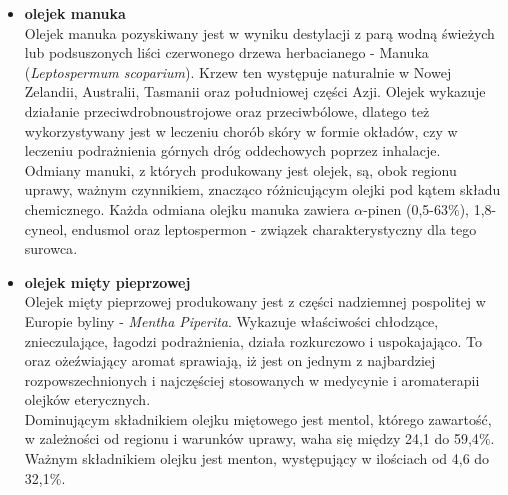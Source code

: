 \documentclass[11pt,a4paper]{report}
\begin{document}
\begin{itemize}
\clearpage
\item \textbf{olejek manuka}\\
Olejek manuka pozyskiwany jest w wyniku destylacji z parą wodną świeżych lub podsuszonych liści czerwonego drzewa herbacianego - Manuka (\textit{Leptospermum scoparium}). Krzew ten występuje naturalnie w Nowej Zelandii, Australii, Tasmanii oraz południowej części Azji. Olejek wykazuje działanie przeciwdrobnoustrojowe oraz przeciwbólowe, dlatego też wykorzystywany jest w leczeniu chorób skóry w formie okładów, czy w leczeniu podrażnienia górnych dróg oddechowych poprzez inhalacje\cite{lis, pollena_ma}.\\
Odmiany manuki, z których produkowany jest olejek, są, obok regionu uprawy,  ważnym czynnikiem, znacząco różnicującym olejki pod kątem składu chemicznego. 
Każda odmiana olejku manuka zawiera $\alpha$-pinen (0,5-63$\%$), 1,8-cyneol, endusmol oraz leptospermon - związek charakterystyczny dla tego surowca\cite{manukaikanuka, lis}.


\item \textbf{olejek mięty pieprzowej}\\
Olejek mięty pieprzowej produkowany jest z części nadziemnej pospolitej w Europie byliny - \textit{Mentha Piperita}\cite{pollena_mi}. Wykazuje właściwości chłodzące, znieczulające, łagodzi podrażnienia, działa rozkurczowo i uspokajająco. To oraz ożeźwiający aromat sprawiają, iż jest on jednym z najbardziej rozpowszechnionych i najczęściej stosowanych w medycynie i aromaterapii olejków eterycznych\cite{pollena, gorailis}.\\
Dominującym składnikiem olejku miętowego jest mentol, którego zawartość, w zależności od regionu i warunków uprawy, waha się między 24,1 do 59,4$\%$. Ważnym składnikiem olejku jest menton, występujący w ilościach od 4,6 do 32,1$\%$\cite{Law}.



\end{itemize}
\end{document}
